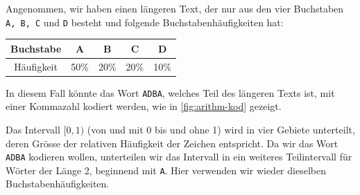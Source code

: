 \begin{myexample}
Angenommen, wir haben einen längeren Text, der nur aus den vier Buchstaben \texttt{A, B, C} und \texttt{D} besteht und folgende Buchstabenhäufigkeiten hat:
\begin{table}[H]
\centering
\begin{tabular}{c||c|c|c|c}
Buchstabe & A & B & C & D \\\midrule
Häufigkeit & 50\% & 20\% & 20\% & 10\%
\end{tabular}
\end{table}

In diesem Fall könnte das Wort \texttt{ADBA}, welches Teil des längeren Texts ist, mit einer Kommazahl kodiert werden, wie in \cref{fig:arithm-kod} gezeigt.

Das Intervall $[0, 1)$ (von und mit 0 bis und ohne 1) wird in vier Gebiete unterteilt, deren Grösse der relativen Häufigkeit der Zeichen entspricht. Da wir das Wort \texttt{ADBA} kodieren wollen, unterteilen wir das Intervall in ein weiteres Teilintervall für Wörter der Länge 2, beginnend mit \texttt{A}. Hier verwenden wir wieder dieselben Buchstabenhäufigkeiten.

\newcommand{\arithmeticTikz}[7]{
    \draw (0,#1) -- (10,#1);   
	
	
    \foreach \i in {1,...,4}{
	    \pgfmathsetmacro{\inc}{#2[\i-1]} %
	    \pgfmathsetmacro{\xStart}{#3[\i-1]} %
	    \pgfmathsetmacro{\xEnd}{\xStart+\inc} %
	    \pgfmathsetmacro{\l}{#4[\i-1]} %

        \draw (\xStart*10,#1+0.2) to (\xStart*10,#1-0.2);
        \draw (\xEnd*10,#1+0.2) to (\xEnd*10,#1-0.2);
        
        \node (\l-Perc) at (\xStart*10,#1-0.4) {\fpeval{round(((1-\xStart)*#6+#7*\xStart),4)}};
        \node (\l-PercEnd) at (\xEnd*10,#1-0.4) {\fpeval{round(((1-\xEnd)*#6+#7*\xEnd),4)}};
        
}}
\end{myexample}
